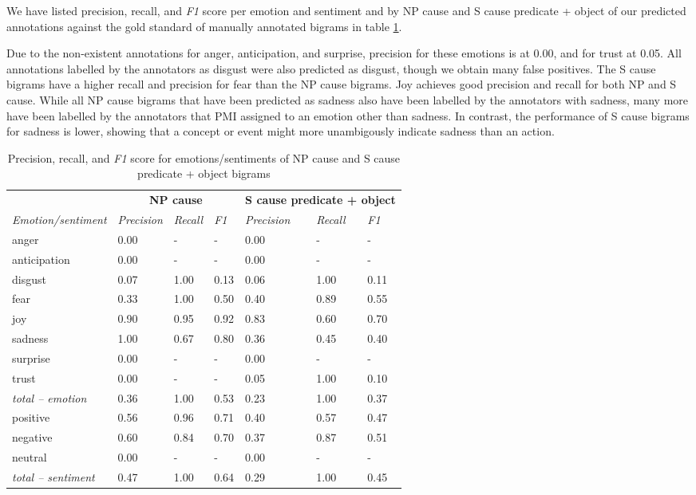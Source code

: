 We have listed precision, recall, and \textit{F1} score per emotion and sentiment and by NP cause and S cause predicate + object of our predicted annotations against the gold standard of manually annotated bigrams in table \ref{tab:bigrams-precision-against-annotation}.

Due to the non-existent annotations for anger, anticipation, and surprise, precision for these emotions is at 0.00, and for trust at 0.05. All annotations labelled by the annotators as disgust were also predicted as disgust, though we obtain many false positives. The S cause bigrams have a higher recall and precision for fear than the NP cause bigrams. Joy achieves good precision and recall for both NP and S cause. While all NP cause bigrams that have been predicted as sadness also have been labelled by the annotators with sadness, many more have been labelled by the annotators that PMI assigned to an emotion other than sadness. In contrast, the performance of S cause bigrams for sadness is lower, showing that a concept or event might more unambigously indicate sadness than an action.

\begin{table}[]
\centering
\begin{tabular}{l|lll|lll}
\multicolumn{1}{c}{{\bf }} & \multicolumn{3}{c}{{\bf NP cause}} & \multicolumn{3}{c}{{\bf S cause predicate + object}} \\
{\it Emotion/sentiment} & {\it Precision} & {\it Recall} & {\it F1} & {\it Precision} & {\it Recall} & {\it F1} \\\hline
anger & 0.00 & - & - & 0.00 & - & - \\
anticipation & 0.00 & - & - & 0.00 & - & - \\
disgust & 0.07 & 1.00 & 0.13 & 0.06 & 1.00 & 0.11\\
fear & 0.33 & 1.00 & 0.50 & 0.40 & 0.89 & 0.55\\
joy & 0.90 & 0.95 & 0.92 & 0.83 & 0.60 & 0.70\\
sadness & 1.00 & 0.67 & 0.80 & 0.36 & 0.45 & 0.40\\
surprise & 0.00 & - & - & 0.00 & - & - \\
trust & 0.00 & - & - & 0.05 & 1.00 & 0.10 \\\hline
\textit{total -- emotion} & 0.36 & 1.00 & 0.53 & 0.23 & 1.00 & 0.37\\\hline
positive & 0.56 & 0.96 & 0.71 & 0.40 & 0.57 & 0.47\\
negative & 0.60 & 0.84 & 0.70 & 0.37 & 0.87 & 0.51\\
neutral & 0.00 & - & - & 0.00 & - & - \\\hline
\textit{total -- sentiment} & 0.47 & 1.00 & 0.64 & 0.29 & 1.00 & 0.45
\end{tabular}
\caption{Precision, recall, and \textit{F1} score for emotions/sentiments of NP cause and S cause predicate + object bigrams}
\label{tab:bigrams-precision-against-annotation}
\end{table}

